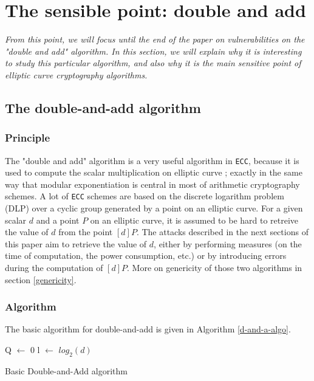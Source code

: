 \documentclass[journal]{IEEEtran}
\begin{document}
\section{The sensible point: double and add}

{\it From this point, we will focus until the end of the paper on vulnerabilities on the "double and add" algorithm. 
In this section, we will explain why it is interesting to study this particular algorithm, and also why it is the main sensitive point
of elliptic curve cryptography algorithms.}

\subsection{The double-and-add algorithm}

\subsubsection{Principle}
The "double and add" algorithm is a very useful algorithm in {\tt ECC}, because it is used to compute the scalar multiplication on elliptic curve ; 
exactly in the same way that modular exponentiation is central in most of arithmetic cryptography schemes. 
A lot of {\tt ECC} schemes are based on the discrete logarithm problem (DLP) over a cyclic group generated by a point on an elliptic curve.
For a given scalar $d$ and a point $P$ on an elliptic curve, it is assumed to be hard to retreive the value of $d$ from the point $[d]P$. 
The attacks described in the next sections of this paper aim to retrieve the value of $d$, either by performing measures (on the time of computation, 
the power consumption, etc.) or by introducing errors during the computation of $[d]P$.
More on genericity of those two algorithms 
in section \ref{genericity}.\\

\subsubsection{Algorithm}
\label{sensible-point-algo}
The basic algorithm for double-and-add is given in Algorithm \ref{d-and-a-algo}.

\begin{algorithm}
    \SetAlgoLined %
   
    \SetSideCommentLeft 
    \SetNoFillComment

    
    
    Q $\leftarrow$ 0\;
    l $\leftarrow$ $log_2(d)$\;

    \bigskip

    \caption{Basic Double-and-Add algorithm}
    \label{d-and-a-algo}

\end{algorithm}
\end{document}
